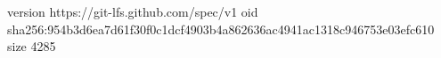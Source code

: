 version https://git-lfs.github.com/spec/v1
oid sha256:954b3d6ea7d61f30f0c1dcf4903b4a862636ac4941ac1318c946753e03efc610
size 4285

